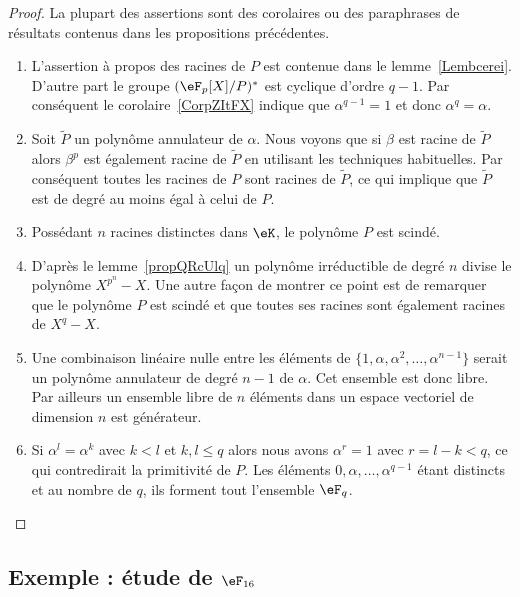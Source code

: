 \begin{proof}
    La plupart des assertions sont des corolaires ou des paraphrases de résultats contenus dans les propositions précédentes.
    \begin{enumerate}
        \item
            L'assertion à propos des racines de \( P\) est contenue dans le lemme~\ref{Lembcerei}. D'autre part le groupe \( (\eF_p[X]/P)^*\) est cyclique d'ordre \( q-1\). Par conséquent le corolaire~\ref{CorpZItFX} indique que \( \alpha^{q-1}=1\) et donc \( \alpha^q=\alpha\).
        \item
            Soit \( \tilde P\) un polynôme annulateur de \( \alpha\). Nous voyons que si \( \beta\) est racine de \( \tilde P\) alors \( \beta^p\) est également racine de \( \tilde P\) en utilisant les techniques habituelles. Par conséquent toutes les racines de \( P\) sont racines de \( \tilde P\), ce qui implique que \( \tilde P\) est de degré au moins égal à celui de \( P\).
        \item
            Possédant \( n\) racines distinctes dans \( \eK\), le polynôme \( P\) est scindé.
        \item
            D'après le lemme~\ref{propQRcUlq} un polynôme irréductible de degré \( n\) divise le polynôme \( X^{p^n}-X\). Une autre façon de montrer ce point est de remarquer que le polynôme \( P\) est scindé et que toutes ses racines sont également racines de \( X^q-X\).
        \item
            Une combinaison linéaire nulle entre les éléments de \( \{ 1,\alpha,\alpha^2,\ldots, \alpha^{n-1} \}\) serait un polynôme annulateur de degré \( n-1\) de \( \alpha\). Cet ensemble est donc libre. Par ailleurs un ensemble libre de \( n\) éléments dans un espace vectoriel de dimension \( n\) est générateur.
        \item
            Si \( \alpha^l=\alpha^k\) avec \( k<l\) et \( k,l\leq q\) alors nous avons \( \alpha^r=1\) avec \( r=l-k<q\), ce qui contredirait la primitivité de \( P\). Les éléments \( 0,\alpha,\ldots, \alpha^{q-1}\) étant distincts et au nombre de \( q\), ils forment tout l'ensemble \( \eF_q\).

    \end{enumerate}
\end{proof}

\subsection{Exemple : étude de \texorpdfstring{$\eF_{16}$}{F16}}

